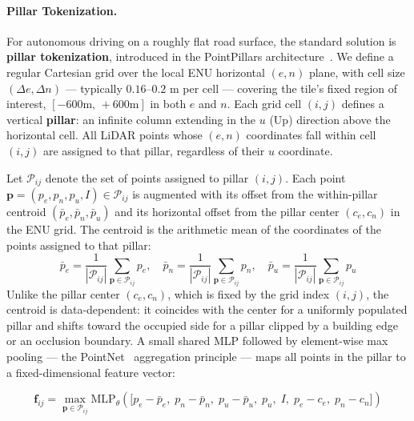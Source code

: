 \documentclass{book}
\begin{document}
\paragraph{Pillar Tokenization.}

For autonomous driving on a roughly flat road surface, the standard
solution is \textbf{pillar tokenization}, introduced in the
PointPillars architecture~\cite{lang2019pointpillars}.  We define a
regular Cartesian grid over the local ENU horizontal $(e, n)$ plane,
with cell size $(\Delta e, \Delta n)$ --- typically $0.16$--$0.2$ m
per cell --- covering the tile's fixed region of interest,
$[-600\text{m},\, +600\text{m}]$ in both $e$ and $n$.  Each grid
cell $(i, j)$ defines a vertical \textbf{pillar}: an infinite column
extending in the $u$ (Up) direction above the horizontal cell.  All
LiDAR points whose $(e, n)$ coordinates fall within cell $(i, j)$
are assigned to that pillar, regardless of their $u$ coordinate.

Let $\mathcal{P}_{ij}$ denote the set of points assigned to pillar
$(i, j)$.  Each point $\mathbf{p} = (p_e, p_n, p_u, I) \in
\mathcal{P}_{ij}$ is augmented with its offset from the within-pillar
centroid $(\bar{p}_e, \bar{p}_n, \bar{p}_u)$ and its horizontal offset
from the pillar center $(c_e, c_n)$ in the ENU grid.  The centroid is
the arithmetic mean of the coordinates of the points assigned to that
pillar:
\begin{equation}
  \bar{p}_e = \frac{1}{|\mathcal{P}_{ij}|}
    \sum_{\mathbf{p} \in \mathcal{P}_{ij}} p_e,
  \quad
  \bar{p}_n = \frac{1}{|\mathcal{P}_{ij}|}
    \sum_{\mathbf{p} \in \mathcal{P}_{ij}} p_n,
  \quad
  \bar{p}_u = \frac{1}{|\mathcal{P}_{ij}|}
    \sum_{\mathbf{p} \in \mathcal{P}_{ij}} p_u
  \label{eq:pillar_centroid}
\end{equation}
Unlike the pillar center $(c_e, c_n)$, which is fixed by the grid
index $(i,j)$, the centroid is data-dependent: it coincides with the
center for a uniformly populated pillar and shifts toward the
occupied side for a pillar clipped by a building edge or an occlusion
boundary.  A small shared MLP followed by
element-wise max pooling --- the PointNet~\cite{qi2017pointnet}
aggregation principle --- maps all points in the pillar to a
fixed-dimensional feature vector:

\begin{equation}
  \mathbf{f}_{ij} = \max_{\mathbf{p} \in \mathcal{P}_{ij}}
    \mathrm{MLP}_\theta
    \!\left(
      \bigl[p_e - \bar{p}_e,\; p_n - \bar{p}_n,\; p_u - \bar{p}_u,\;
      p_u,\; I,\; p_e - c_e,\; p_n - c_n\bigr]
    \right)
  \label{eq:pillar}
\end{equation}
\end{document}
